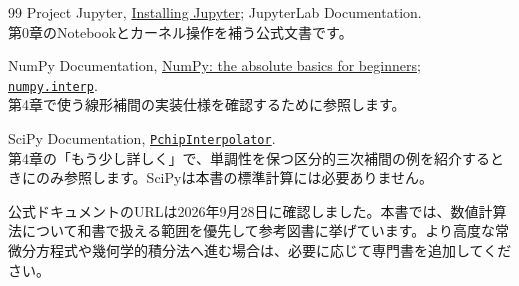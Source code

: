 \begin{thebibliography}{99}
Project Jupyter, \href{https://jupyter.org/install}{Installing Jupyter}; JupyterLab Documentation.\\
第0章のNotebookとカーネル操作を補う公式文書です。

NumPy Documentation, \href{https://numpy.org/doc/stable/user/absolute_beginners.html}{NumPy: the absolute basics for beginners}; \href{https://numpy.org/doc/stable/reference/generated/numpy.interp.html}{\texttt{numpy.interp}}.\\
第4章で使う線形補間の実装仕様を確認するために参照します。



SciPy Documentation, \href{https://docs.scipy.org/doc/scipy/reference/generated/scipy.interpolate.PchipInterpolator.html}{\texttt{PchipInterpolator}}.\\
第4章の「もう少し詳しく」で、単調性を保つ区分的三次補間の例を紹介するときにのみ参照します。SciPyは本書の標準計算には必要ありません。

\end{thebibliography}

\noindent\small
公式ドキュメントのURLは2026年9月28日に確認しました。本書では、数値計算法について和書で扱える範囲を優先して参考図書に挙げています。より高度な常微分方程式や幾何学的積分法へ進む場合は、必要に応じて専門書を追加してください。
